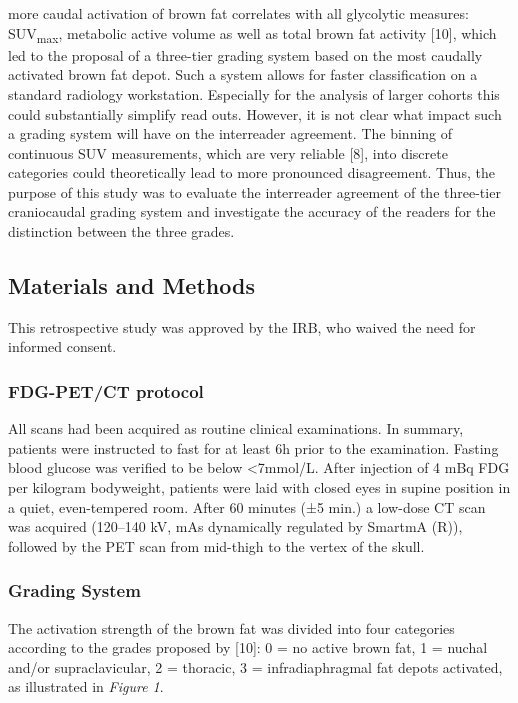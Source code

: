 \documentclass[]{elsarticle} %
\begin{document}
more caudal activation of brown fat correlates with all glycolytic
measures: SUV\textsubscript{max}, metabolic active volume as well as
total brown fat activity {[}10{]}, which led to the proposal of a
three-tier grading system based on the most caudally activated brown fat
depot. Such a system allows for faster classification on a standard
radiology workstation. Especially for the analysis of larger cohorts
this could substantially simplify read outs. However, it is not clear
what impact such a grading system will have on the interreader
agreement. The binning of continuous SUV measurements, which are very
reliable {[}8{]}, into discrete categories could theoretically lead to
more pronounced disagreement. Thus, the purpose of this study was to
evaluate the interreader agreement of the three-tier craniocaudal
grading system and investigate the accuracy of the readers for the
distinction between the three grades.

\subsection{Materials and Methods}\label{materials-and-methods}

This retrospective study was approved by the IRB, who waived the need
for informed consent.

\subsubsection{FDG-PET/CT protocol}\label{fdg-petct-protocol}

All scans had been acquired as routine clinical examinations. In
summary, patients were instructed to fast for at least 6h prior to the
examination. Fasting blood glucose was verified to be below
\textless{}7mmol/L. After injection of 4 mBq FDG per kilogram
bodyweight, patients were laid with closed eyes in supine position in a
quiet, even-tempered room. After 60 minutes (±5 min.) a low-dose CT scan
was acquired (120--140 kV, mAs dynamically regulated by SmartmA (R)),
followed by the PET scan from mid-thigh to the vertex of the skull.

\subsubsection{Grading System}\label{grading-system}

The activation strength of the brown fat was divided into four
categories according to the grades proposed by {[}10{]}: 0 = no active
brown fat, 1 = nuchal and/or supraclavicular, 2 = thoracic, 3 =
infradiaphragmal fat depots activated, as illustrated in \emph{Figure
1}.
\end{document}
